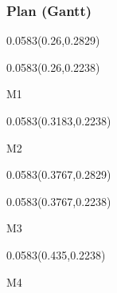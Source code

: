 \documentclass[aspectratio=169]{beamer}
\begin{document}
\begin{frame}[t]
  \frametitle{Plan (Gantt)}

%
\begin{textblock}{0.0583}(0.26,0.2829)
\end{textblock}

\begin{textblock}{0.0583}(0.26,0.2238)
{\centering\fontsize{10}{12}\selectfont \textcolor[HTML]{555555}{M1}\par}
\end{textblock}

\begin{textblock}{0.0583}(0.3183,0.2238)
{\centering\fontsize{10}{12}\selectfont \textcolor[HTML]{555555}{M2}\par}
\end{textblock}

%
\begin{textblock}{0.0583}(0.3767,0.2829)
\end{textblock}

\begin{textblock}{0.0583}(0.3767,0.2238)
{\centering\fontsize{10}{12}\selectfont \textcolor[HTML]{555555}{M3}\par}
\end{textblock}

\begin{textblock}{0.0583}(0.435,0.2238)
{\centering\fontsize{10}{12}\selectfont \textcolor[HTML]{555555}{M4}\par}
\end{textblock}


\end{frame}
\end{document}
